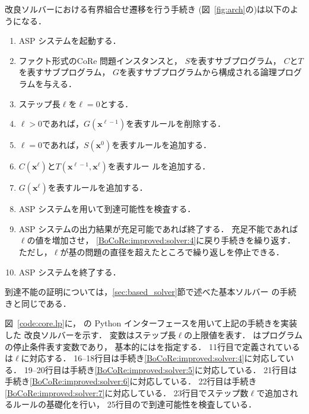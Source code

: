 改良ソルバーにおける有界組合せ遷移を行う手続き
(図~\ref{fig:arch}の)は以下のようになる．
\begin{enumerate}
  \item ASP システムを起動する．
  \item ファクト形式のCoRe 問題インスタンスと，
    $S$を表すサブプログラム，
    $C$と$T$を表すサブプログラム，
    $G$を表すサブプログラムから構成される論理プログラムを与える．
  \item ステップ長$\ell$を$\ell=0$とする．
  \item \label{BoCoRe:improved:solver:4}
    $\ell > 0$であれば，$G(\bm{x}^{\ell -1})$を表すルールを削除する．
  \item \label{BoCoRe:improved:solver:5}
    $\ell=0$であれば，$S(\bm{x}^0)$を表すルールを追加する．
  \item \label{BoCoRe:improved:solver:6}
    $C(\bm{x}^{\ell})$と$T(\bm{x}^{\ell -1}, \bm{x}^{\ell})$を表すルー
    ルを追加する．
  \item \label{BoCoRe:improved:solver:7}
    $G(\bm{x}^{\ell})$を表すルールを追加する．
  \item ASP システムを用いて到達可能性を検査する．
  \item ASP システムの出力結果が充足可能であれば終了する．
        充足不能であれば$\ell$の値を増加させ，
        \ref{BoCoRe:improved:solver:4}に戻り手続きを繰り返す．
        ただし，$\ell$が基の問題の直径を超えたところで繰り返しを停止できる．
  \item ASP システムを終了する．
\end{enumerate}
到達不能の証明については，\ref{sec:based_solver}節で述べた基本ソルバー
の手続きと同じである．

図~\ref{code:core.lp}に，
{\clingo}の Python インターフェースを用いて上記の手続きを実装した
改良ソルバーを示す．
%
変数はステップ長$\ell$の上限値を表す．
はプログラムの停止条件表す変数であり，
基本的にはを指定する．
11行目で定義されているは$\ell$に対応する．
16--18行目は手続き\ref{BoCoRe:improved:solver:4}に対応している．
19--20行目は手続き\ref{BoCoRe:improved:solver:5}に対応している．
21行目は手続き\ref{BoCoRe:improved:solver:6}に対応している．
22行目は手続き\ref{BoCoRe:improved:solver:7}に対応している．
23行目でステップ数$\ell$で追加されるルールの基礎化を行い，
25行目ので到達可能性を検査している．

